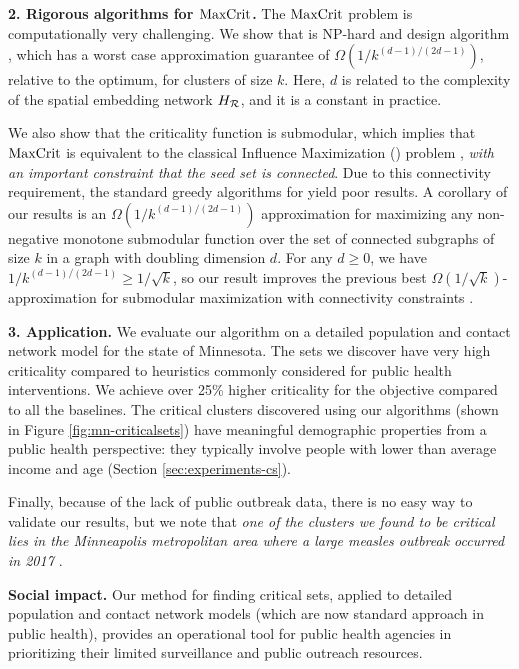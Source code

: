 \noindent
\textbf{2. Rigorous algorithms for $\text{MaxCrit}{}$.}
The $\text{MaxCrit}{}$ problem is computationally very challenging. We show that \maxcrit{} is NP-hard and design algorithm \algomaxcrit{}, which has a worst case approximation guarantee of $\Omega(1/k^{(d-1)/(2d-1)})$, relative to the optimum, for clusters of size $k$. Here, $d$ is related to the complexity of the spatial embedding network $H_{\mathcal{R}}$, and it is a constant in practice. 

We also show that the criticality function is submodular, which implies that $\text{MaxCrit}{}$ is equivalent to the classical Influence Maximization (\infmax) problem \cite{kempe:sigkdd03}, \emph{with an important constraint that the seed set is connected}. Due to this connectivity requirement, the standard greedy algorithms for \infmax{} yield poor results. %
A corollary of our results is an $\Omega(1/k^{(d-1)/(2d-1)})$ approximation for maximizing any non-negative monotone submodular function over the set of connected subgraphs of size $k$ in a graph with doubling dimension $d$. For any $d\geq0$, we have $1/k^{(d-1)/(2d-1)}\geq 1/\sqrt{k}$, so our result improves the previous best $\Omega(1/\sqrt{k})$-approximation for submodular maximization with connectivity constraints \cite{kuo2015maximizing}.


\noindent
\textbf{3. Application.} 
We evaluate our algorithm on a detailed population and contact network model for the state of Minnesota.
The sets we discover have very high criticality compared to
heuristics commonly considered for public health interventions.
We achieve over 25\% higher criticality for the objective compared to all the baselines.
The critical clusters discovered using our algorithms (shown in Figure \ref{fig:mn-criticalsets})
have meaningful demographic properties
from a public health perspective: they typically involve people with lower than average
income and age (Section \ref{sec:experiments-cs}).

Finally, because of the lack of public outbreak data, there is no easy way to validate our results, but we note that \emph{one of the clusters we found to be critical lies in the Minneapolis metropolitan area where a large measles outbreak occurred in 2017 \cite{hall:mmwr17}}.


\noindent
\textbf{Social impact.}
Our method for finding critical sets, applied to detailed population and contact network models (which are now standard approach in public health), provides an operational tool for public health agencies in prioritizing their limited surveillance and public outreach resources.






